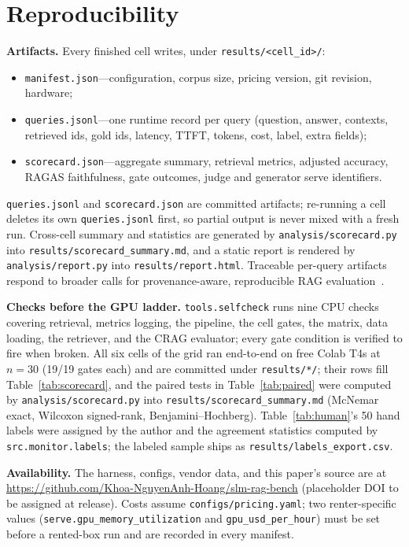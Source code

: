 
\section{Reproducibility}
\label{sec:repro}

\textbf{Artifacts.}
Every finished cell writes, under \texttt{results/<cell\_id>/}:

\begin{itemize}
    \item \texttt{manifest.json}---configuration, corpus size, pricing
          version, git revision, hardware;
    \item \texttt{queries.jsonl}---one runtime record per query
          (question, answer, contexts, retrieved ids, gold ids, latency,
          TTFT, tokens, cost, label, extra fields);
    \item \texttt{scorecard.json}---aggregate summary, retrieval metrics,
          adjusted accuracy, RAGAS faithfulness, gate outcomes, judge and
          generator serve identifiers.
\end{itemize}

\texttt{queries.jsonl} and \texttt{scorecard.json} are committed
artifacts; re-running a cell deletes its own \texttt{queries.jsonl}
first, so partial output is never mixed with a fresh run. Cross-cell
summary and statistics are generated by
\texttt{analysis/scorecard.py} into
\texttt{results/scorecard\_summary.md}, and a static report is rendered by
\texttt{analysis/report.py} into \texttt{results/report.html}. Traceable
per-query artifacts respond to broader calls for provenance-aware,
reproducible RAG evaluation~\cite{brown2025systematic,murugaraj2025ragvue,saadfalcon2023ares,sharma2025survey}.

\textbf{Checks before the GPU ladder.}
\texttt{tools.selfcheck} runs nine CPU checks covering retrieval,
metrics logging, the pipeline, the cell gates, the matrix, data loading,
the retriever, and the CRAG evaluator; every gate condition is verified
to fire when broken. All six cells of the grid ran end-to-end on free Colab
T4s at $n=30$ (19/19 gates each) and are committed under \texttt{results/*/};
their rows fill Table~\ref{tab:scorecard}, and the paired tests in
Table~\ref{tab:paired} were computed by \texttt{analysis/scorecard.py} into
\texttt{results/scorecard\_summary.md} (McNemar exact, Wilcoxon signed-rank,
Benjamini--Hochberg). Table~\ref{tab:human}'s 50 hand labels were assigned by the author and the
agreement statistics computed by \texttt{src.monitor.labels}; the labeled
sample ships as \texttt{results/labels\_export.csv}.

\textbf{Availability.}
The harness, configs, vendor data, and this paper's source are at
\url{https://github.com/Khoa-NguyenAnh-Hoang/slm-rag-bench}
(placeholder DOI to be assigned at release). Costs assume
\texttt{configs/pricing.yaml}; two renter-specific values
(\texttt{serve.gpu\_memory\_utilization} and
\texttt{gpu\_usd\_per\_hour}) must be set before a rented-box run and are
recorded in every manifest.
